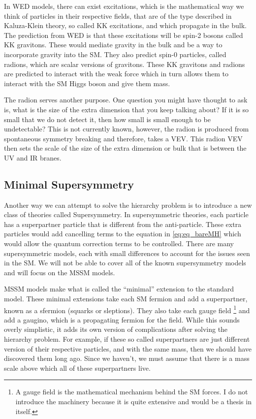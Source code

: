 In WED models, there can exist excitations, which is the mathematical way we think of particles in their respective fields, that are of the type described in Kaluza-Klein theory, so called KK excitations, and which propagate in the bulk.
The prediction from WED is that these excitations will be spin-2 bosons called KK gravitons. These would mediate gravity in the bulk and be a way to incorporate gravity into the SM. 
They also predict spin-0 particles, called radions, which are scalar versions of gravitons. 
These KK gravitons and radions are predicted to interact with the weak force which in turn allows them to interact with the SM Higgs boson and give them mass.

The radion serves another purpose. One question you might have thought to ask is, what is the size of the extra dimension that you keep talking about? 
If it is so small that we do not detect it, then how small is small enough to be undetectable? 
This is not currently known, however, the radion is produced from spontaneous symmetry breaking and therefore, takes a VEV.
This radion VEV then sets the scale of the size of the extra dimension or bulk that is between the UV and IR branes. 

\subsection{Minimal Supersymmetry}

Another way we can attempt to solve the hierarchy problem is to introduce a new class of theories called Supersymmetry.
In supersymmetric theories, each particle has a superpartner particle that is different from the anti-particle.
These extra particles would add cancelling terms to the equation in \ref{eq:eq_bareMH} which would allow the quantum correction terms to be controlled.
There are many supersymmetric models, each with small differences to account for the issues seen in the SM. We will not be able to cover all of the known supersymmetry models and will focus on the MSSM models.

MSSM models make what is called the ``minimal'' extension to the standard model. These minimal extensions take each SM fermion and add a superpartner, known as a sfermion (squarks or sleptions).
They also take each gauge field \footnote{A gauge field is the mathematical mechanism behind the SM forces. I do not introduce the machinery because it is quite extensive and would be a thesis in itself.} and add a gaugino, which is a propagating fermion for the field.
While this sounds overly simplistic, it adds its own version of complications after solving the hierarchy problem. 
For example, if these so called superpartners are just different version of their respective particles, and with the same mass, then we should have discovered them long ago.
Since we haven't, we must assume that there is a mass scale above which all of these superpartners live. 

